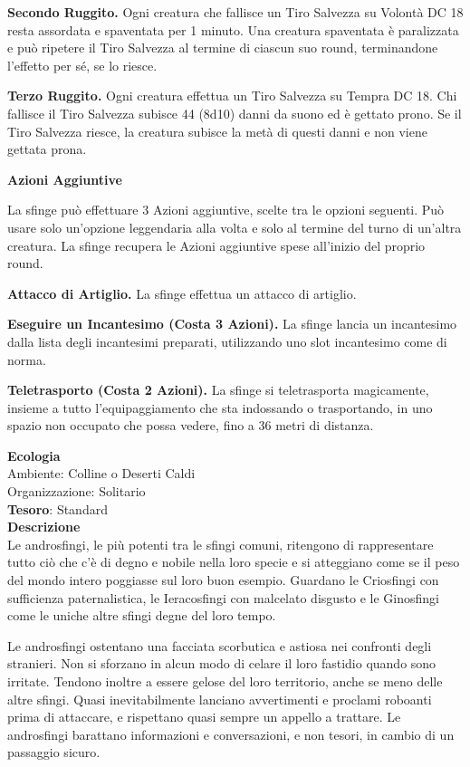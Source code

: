\begin{multicols}{2}
\textbf{Secondo Ruggito.} Ogni creatura che fallisce un Tiro Salvezza su Volontà DC 18 resta assordata e spaventata per 1 minuto. Una creatura spaventata è paralizzata e può ripetere il Tiro Salvezza al termine di ciascun suo round, terminandone l'effetto per sé, se lo riesce.

\textbf{Terzo Ruggito.} Ogni creatura effettua un Tiro Salvezza su Tempra DC 18. Chi fallisce il Tiro Salvezza subisce 44 (8d10) danni da suono ed è gettato prono. Se il Tiro Salvezza riesce, la creatura subisce la metà di questi danni e non viene gettata prona.

\textbf{Azioni Aggiuntive}

La sfinge può effettuare 3 Azioni aggiuntive, scelte tra le opzioni seguenti. Può usare solo un'opzione leggendaria alla volta e solo al termine del turno di un'altra creatura. La sfinge recupera le Azioni aggiuntive spese all'inizio del proprio round.

\textbf{Attacco di Artiglio.} La sfinge effettua un attacco di artiglio.

\textbf{Eseguire un Incantesimo (Costa 3 Azioni).} La sfinge lancia un incantesimo dalla lista degli incantesimi preparati, utilizzando uno slot incantesimo come di norma.

\textbf{Teletrasporto (Costa 2 Azioni).} La sfinge si teletrasporta magicamente, insieme a tutto l'equipaggiamento che sta indossando o trasportando, in uno spazio non occupato che possa vedere, fino a 36 metri di distanza.


\textbf{Ecologia}\\
Ambiente: Colline o Deserti Caldi\\
Organizzazione: Solitario\\
\textbf{Tesoro}: Standard\\
\textbf{Descrizione}\\
Le androsfingi, le più potenti tra le sfingi comuni, ritengono di rappresentare tutto ciò che c'è di degno e nobile nella loro specie e si atteggiano come se il peso del mondo intero poggiasse sul loro buon esempio. Guardano le Criosfingi con sufficienza paternalistica, le Ieracosfingi con malcelato disgusto e le Ginosfingi come le uniche altre sfingi degne del loro tempo.

Le androsfingi ostentano una facciata scorbutica e astiosa nei confronti degli stranieri. Non si sforzano in alcun modo di celare il loro fastidio quando sono irritate. Tendono inoltre a essere gelose del loro territorio, anche se meno delle altre sfingi. Quasi inevitabilmente lanciano avvertimenti e proclami roboanti prima di attaccare, e rispettano quasi sempre un appello a trattare. Le androsfingi barattano informazioni e conversazioni, e non tesori, in cambio di un passaggio sicuro.


\end{multicols}
